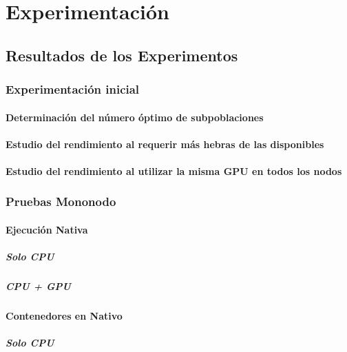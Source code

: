 \chapter{Experimentación}\label{cap:experimentacion}

\section{Resultados de los Experimentos}

\subsection{Experimentación inicial}

\subsubsection{Determinación del número óptimo de subpoblaciones}

\subsubsection{Estudio del rendimiento al requerir más hebras de las disponibles}

\subsubsection{Estudio del rendimiento al utilizar la misma GPU en todos los nodos}

\subsection{Pruebas Mononodo}
\subsubsection{Ejecución Nativa}
\paragraph{Solo CPU}

\paragraph{CPU + GPU}

\subsubsection{Contenedores en Nativo}
\paragraph{Solo CPU}

